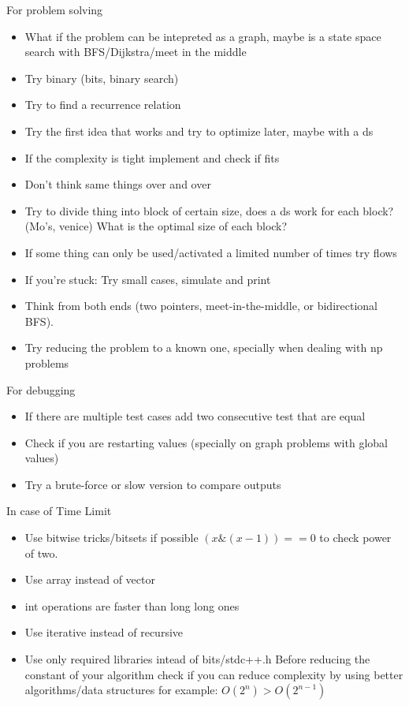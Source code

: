 For problem solving
\begin{itemize}
  \item What if the problem can be intepreted as a graph, maybe is a state space search with BFS/Dijkstra/meet in the middle
  \item Try binary (bits, binary search) 
  \item Try to find a recurrence relation
  \item Try the first idea that works and try to optimize later, maybe with a ds
  \item If the complexity is tight implement and check if fits
  \item Don't think same things over and over
  \item Try to divide thing into block of certain size, does a ds work for each block? (Mo's, venice) What is the optimal size of each block?
  \item If some thing can only be used/activated a limited number of times try flows
  \item If you’re stuck: Try small cases, simulate and print
  \item Think from both ends (two pointers, meet-in-the-middle, or bidirectional BFS).
  \item Try reducing the problem to a known one, specially when dealing with np problems
\end{itemize}

For debugging
\begin{itemize}
    \item If there are multiple test cases add two consecutive test that are equal
    \item Check if you are restarting values (specially on graph problems with global values)
    \item Try a brute-force or slow version to compare outputs 
\end{itemize}

In case of Time Limit
\begin{itemize}
    \item Use bitwise tricks/bitsets if possible $(x \& (x - 1)) == 0$ to check power of two.
    \item Use array instead of vector
    \item int operations are faster than long long ones
    \item Use iterative instead of recursive
    \item Use only required libraries intead of bits/stdc++.h
Before reducing the constant of your algorithm check if you can reduce complexity by using better algorithms/data structures
for example:
$O(2^n) > O(2^{n−1})$
\end{itemize}